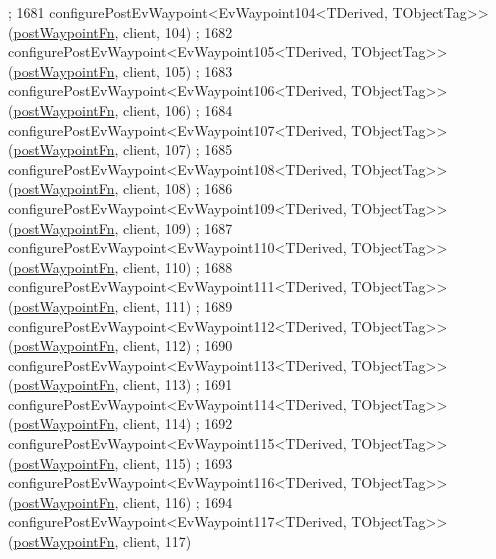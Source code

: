 \begin{DoxyCode}
      ;
1681     configurePostEvWaypoint<EvWaypoint104<TDerived, TObjectTag>>(\hyperlink{classsmacc_1_1WaypointEventDispatcher_a6bccf6a93a827634b7b5e67ac0e4ec57}{postWaypointFn}, client, 104)
      ;
1682     configurePostEvWaypoint<EvWaypoint105<TDerived, TObjectTag>>(\hyperlink{classsmacc_1_1WaypointEventDispatcher_a6bccf6a93a827634b7b5e67ac0e4ec57}{postWaypointFn}, client, 105)
      ;
1683     configurePostEvWaypoint<EvWaypoint106<TDerived, TObjectTag>>(\hyperlink{classsmacc_1_1WaypointEventDispatcher_a6bccf6a93a827634b7b5e67ac0e4ec57}{postWaypointFn}, client, 106)
      ;
1684     configurePostEvWaypoint<EvWaypoint107<TDerived, TObjectTag>>(\hyperlink{classsmacc_1_1WaypointEventDispatcher_a6bccf6a93a827634b7b5e67ac0e4ec57}{postWaypointFn}, client, 107)
      ;
1685     configurePostEvWaypoint<EvWaypoint108<TDerived, TObjectTag>>(\hyperlink{classsmacc_1_1WaypointEventDispatcher_a6bccf6a93a827634b7b5e67ac0e4ec57}{postWaypointFn}, client, 108)
      ;
1686     configurePostEvWaypoint<EvWaypoint109<TDerived, TObjectTag>>(\hyperlink{classsmacc_1_1WaypointEventDispatcher_a6bccf6a93a827634b7b5e67ac0e4ec57}{postWaypointFn}, client, 109)
      ;
1687     configurePostEvWaypoint<EvWaypoint110<TDerived, TObjectTag>>(\hyperlink{classsmacc_1_1WaypointEventDispatcher_a6bccf6a93a827634b7b5e67ac0e4ec57}{postWaypointFn}, client, 110)
      ;
1688     configurePostEvWaypoint<EvWaypoint111<TDerived, TObjectTag>>(\hyperlink{classsmacc_1_1WaypointEventDispatcher_a6bccf6a93a827634b7b5e67ac0e4ec57}{postWaypointFn}, client, 111)
      ;
1689     configurePostEvWaypoint<EvWaypoint112<TDerived, TObjectTag>>(\hyperlink{classsmacc_1_1WaypointEventDispatcher_a6bccf6a93a827634b7b5e67ac0e4ec57}{postWaypointFn}, client, 112)
      ;
1690     configurePostEvWaypoint<EvWaypoint113<TDerived, TObjectTag>>(\hyperlink{classsmacc_1_1WaypointEventDispatcher_a6bccf6a93a827634b7b5e67ac0e4ec57}{postWaypointFn}, client, 113)
      ;
1691     configurePostEvWaypoint<EvWaypoint114<TDerived, TObjectTag>>(\hyperlink{classsmacc_1_1WaypointEventDispatcher_a6bccf6a93a827634b7b5e67ac0e4ec57}{postWaypointFn}, client, 114)
      ;
1692     configurePostEvWaypoint<EvWaypoint115<TDerived, TObjectTag>>(\hyperlink{classsmacc_1_1WaypointEventDispatcher_a6bccf6a93a827634b7b5e67ac0e4ec57}{postWaypointFn}, client, 115)
      ;
1693     configurePostEvWaypoint<EvWaypoint116<TDerived, TObjectTag>>(\hyperlink{classsmacc_1_1WaypointEventDispatcher_a6bccf6a93a827634b7b5e67ac0e4ec57}{postWaypointFn}, client, 116)
      ;
1694     configurePostEvWaypoint<EvWaypoint117<TDerived, TObjectTag>>(\hyperlink{classsmacc_1_1WaypointEventDispatcher_a6bccf6a93a827634b7b5e67ac0e4ec57}{postWaypointFn}, client, 117)

\end{DoxyCode}

